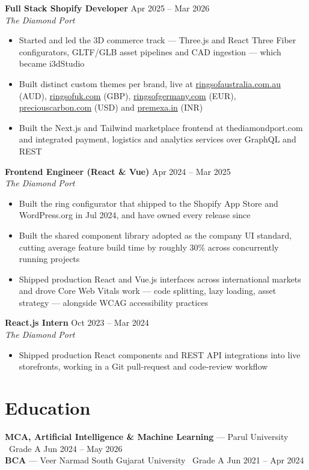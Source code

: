 \documentclass[10pt]{article}
\begin{document}
\textbf{Full Stack Shopify Developer} \hfill Apr 2025 -- Mar 2026 \\
\textit{The Diamond Port}
\begin{itemize}
  \item Started and led the 3D commerce track --- Three.js and React Three Fiber configurators, GLTF/GLB asset pipelines and CAD ingestion --- which became i3dStudio
  \item Built distinct custom themes per brand, live at \href{https://ringsofaustralia.com.au}{ringsofaustralia.com.au} (AUD), \href{https://ringsofuk.com}{ringsofuk.com} (GBP), \href{https://ringsofgermany.com}{ringsofgermany.com} (EUR), \href{https://www.preciouscarbon.com}{preciouscarbon.com} (USD) and \href{https://premexa.in}{premexa.in} (INR)
  \item Built the Next.js and Tailwind marketplace frontend at thediamondport.com and integrated payment, logistics and analytics services over GraphQL and REST
\end{itemize}

\vspace{1pt}

\textbf{Frontend Engineer (React \& Vue)} \hfill Apr 2024 -- Mar 2025 \\
\textit{The Diamond Port}
\begin{itemize}
  \item Built the ring configurator that shipped to the Shopify App Store and WordPress.org in Jul 2024, and have owned every release since
  \item Built the shared component library adopted as the company UI standard, cutting average feature build time by roughly 30\% across concurrently running projects
  \item Shipped production React and Vue.js interfaces across international markets and drove Core Web Vitals work --- code splitting, lazy loading, asset strategy --- alongside WCAG accessibility practices
\end{itemize}

\vspace{1pt}

\textbf{React.js Intern} \hfill Oct 2023 -- Mar 2024 \\
\textit{The Diamond Port}
\begin{itemize}
  \item Shipped production React components and REST API integrations into live storefronts, working in a Git pull-request and code-review workflow
\end{itemize}

\section*{Education}
\textbf{MCA, Artificial Intelligence \& Machine Learning} --- Parul University \textbullet\ Grade A \hfill Jun 2024 -- May 2026 \\
\textbf{BCA} --- Veer Narmad South Gujarat University \textbullet\ Grade A \hfill Jun 2021 -- Apr 2024
\end{document}
